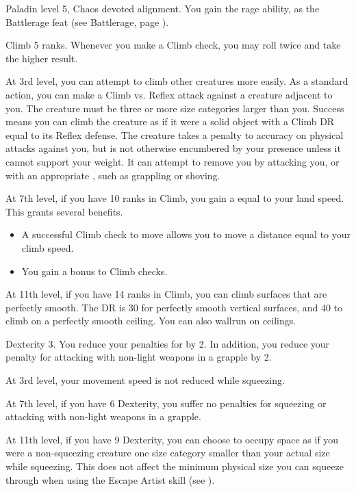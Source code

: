     \featpres Paladin level 5, Chaos devoted alignment.
    \featben You gain the rage ability, as the Battlerage feat (see Battlerage, page ).

    \featpre Climb 5 ranks.
    \featben Whenever you make a Climb check, you may roll twice and take the higher result.

    At 3rd level, you can attempt to climb other creatures more easily.
    As a standard action, you can make a Climb vs. Reflex attack against a creature adjacent to you.
    The creature must be three or more size categories larger than you.
    Success means you can climb the creature as if it were a solid object with a Climb DR equal to its Reflex defense.
    The creature takes a  penalty to accuracy on physical attacks against you, but is not otherwise encumbered by your presence unless it cannot support your weight.
    It can attempt to remove you by attacking you, or with an appropriate , such as grappling or shoving.

    At 7th level, if you have 10 ranks in Climb, you gain a  equal to your land speed.
    This grants several benefits.
    \begin{itemize}
        \item A successful Climb check to move allows you to move a distance equal to your climb speed.
        \item You gain a  bonus to Climb checks.
    \end{itemize}

    At 11th level, if you have 14 ranks in Climb, you can climb surfaces that are perfectly smooth.
    The DR is 30 for perfectly smooth vertical surfaces, and 40 to climb on a perfectly smooth ceiling.
    You can also wallrun on ceilings.

    \featpre Dexterity 3.
    \featben You reduce your penalties for  by 2. In addition, you reduce your penalty for attacking with non-light weapons in a grapple by 2.

    At 3rd level, your movement speed is not reduced while squeezing.

    At 7th level, if you have 6 Dexterity, you suffer no penalties for squeezing or attacking with non-light weapons in a grapple.

    At 11th level, if you have 9 Dexterity, you can choose to occupy space as if you were a non-squeezing creature one size category smaller than your actual size while squeezing.
    This does not affect the minimum physical size you can squeeze through when using the Escape Artist skill (see ).

